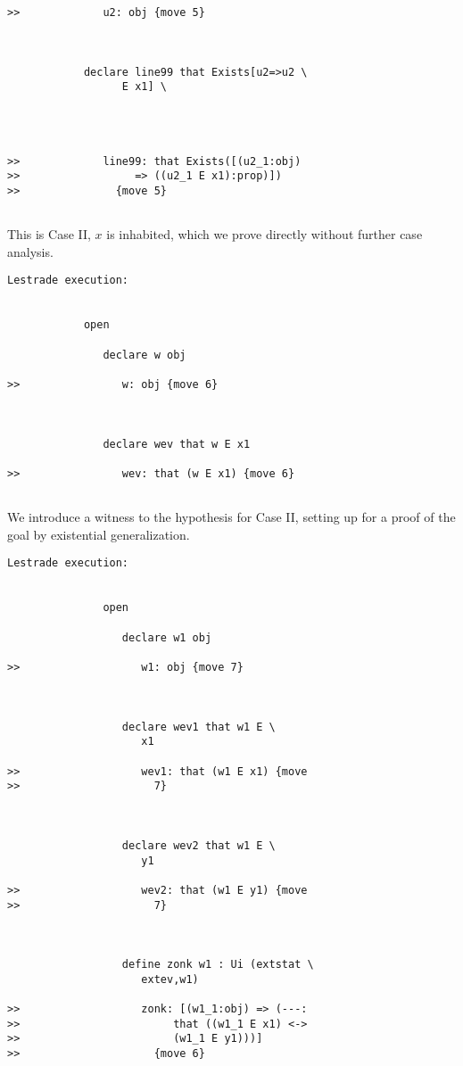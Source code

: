 \documentclass{article}
\begin{document}
{\begin{verbatim}
>>             u2: obj {move 5}



            declare line99 that Exists[u2=>u2 \
                  E x1] \
               



>>             line99: that Exists([(u2_1:obj)
>>                  => ((u2_1 E x1):prop)])
>>               {move 5}


\end{verbatim}

This is Case II, $x$ is inhabited, which we prove directly without further case analysis.

\begin{verbatim}Lestrade execution:


            open

               declare w obj

>>                w: obj {move 6}



               declare wev that w E x1

>>                wev: that (w E x1) {move 6}


\end{verbatim}

We introduce a witness to the hypothesis for Case II, setting up for a proof of the goal by existential generalization.

\begin{verbatim}Lestrade execution:


               open

                  declare w1 obj

>>                   w1: obj {move 7}



                  declare wev1 that w1 E \
                     x1

>>                   wev1: that (w1 E x1) {move
>>                     7}



                  declare wev2 that w1 E \
                     y1

>>                   wev2: that (w1 E y1) {move
>>                     7}



                  define zonk w1 : Ui (extstat \
                     extev,w1)

>>                   zonk: [(w1_1:obj) => (---:
>>                        that ((w1_1 E x1) <->
>>                        (w1_1 E y1)))]
>>                     {move 6}




\end{verbatim}}
\end{document}
